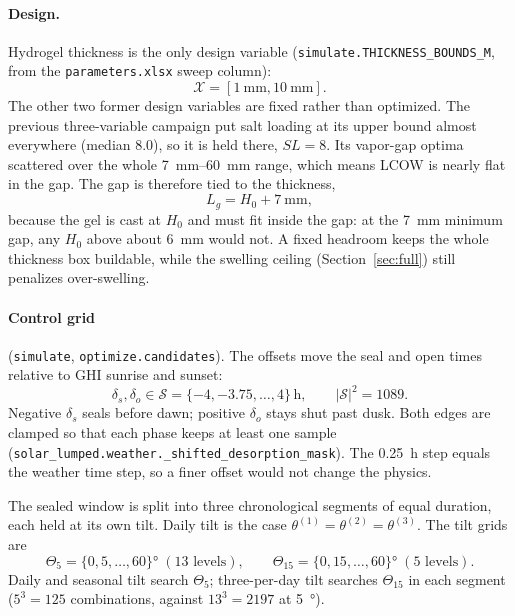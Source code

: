\documentclass[11pt]{article}
\newcommand{\code}[1]{\texttt{#1}}
\begin{document}
\paragraph{Design.} Hydrogel thickness is the only design variable
(\code{simulate.THICKNESS\_BOUNDS\_M}, from the \code{parameters.xlsx} sweep column):
\begin{equation}
\mathcal{X} = [\SI{1}{\milli\metre}, \SI{10}{\milli\metre}].
\end{equation}
The other two former design variables are fixed rather than optimized. The previous
three-variable campaign put salt loading at its upper bound almost everywhere (median 8.0),
so it is held there, $SL = 8$. Its vapor-gap optima scattered over the whole
\SIrange{7}{60}{\milli\metre} range, which means LCOW is nearly flat in the gap. The gap is
therefore tied to the thickness,
\begin{equation}
L_g = H_0 + \SI{7}{\milli\metre},
\end{equation}
because the gel is cast at $H_0$ and must fit inside the gap: at the \SI{7}{\milli\metre}
minimum gap, any $H_0$ above about \SI{6}{\milli\metre} would not. A fixed headroom keeps
the whole thickness box buildable, while the swelling ceiling (Section~\ref{sec:full}) still
penalizes over-swelling.

\paragraph{Control grid} (\code{simulate}, \code{optimize.candidates}). The offsets move
the seal and open times relative to GHI sunrise and sunset:
\begin{equation}
\delta_s, \delta_o \in \mathcal{S} = \{-4, -3.75, \dots, 4\}\,\si{\hour},
\qquad |\mathcal{S}|^2 = 1089.
\end{equation}
Negative $\delta_s$ seals before dawn; positive $\delta_o$ stays shut past dusk. Both edges
are clamped so that each phase keeps at least one sample
(\code{solar\_lumped.weather.\_shifted\_desorption\_mask}). The \SI{0.25}{\hour} step equals
the weather time step, so a finer offset would not change the physics.

The sealed window is split into three chronological segments of equal duration, each held
at its own tilt. Daily tilt is the case $\theta^{(1)} = \theta^{(2)} = \theta^{(3)}$. The
tilt grids are
\begin{equation}
\Theta_5 = \{0, 5, \dots, 60\}\si{\degree} \;(13 \text{ levels}),
\qquad
\Theta_{15} = \{0, 15, \dots, 60\}\si{\degree} \;(5 \text{ levels}).
\end{equation}
Daily and seasonal tilt search $\Theta_5$; three-per-day tilt searches $\Theta_{15}$ in each
segment ($5^3 = 125$ combinations, against $13^3 = 2197$ at \SI{5}{\degree}).
\end{document}
